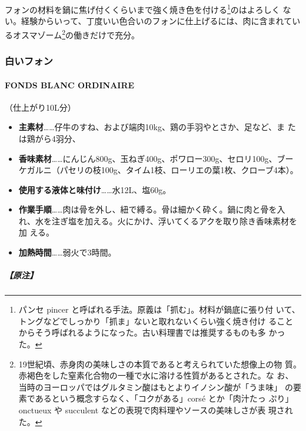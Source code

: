 \begin{recette}
フォンの材料を鍋に焦げ付くくらいまで強く焼き色を付ける\footnote{パンセ
  pincer と呼ばれる手法。原義は「抓む」。材料が鍋底に張り付
  いて、トングなどでしっかり「抓ま」ないと取れないくらい強く焼き付け
  ることからそう呼ばれるようになった。古い料理書では推奨するものも多
  かった。}のはよろしく
ない。経験からいって、丁度いい色合いのフォンに仕上げるには、肉に含まれてい
るオスマゾーム\footnote{19世紀頃、赤身肉の美味しさの本質であると考えられていた想像上の物
  質。赤褐色をした窒素化合物の一種で水に溶ける性質があるとされた。な
  お、当時のヨーロッパではグルタミン酸はもとよりイノシン酸が「うま味」
  の要素であるという概念すらなく、「コクがある」corsé とか「肉汁たっ
  ぷり」onctueux や succulent などの表現で肉料理やソースの美味しさが表
  現された。}の働きだけで充分。

\maeaki

\hypertarget{ux767dux3044ux30d5ux30a9ux30f3}{%
\subsubsection{白いフォン}\label{ux767dux3044ux30d5ux30a9ux30f3}}

\hypertarget{fonds-blanc}{%
\paragraph{FONDS BLANC ORDINAIRE}\label{fonds-blanc}}


（仕上がり10L分）

\begin{itemize}
\item
  \textbf{主素材}\ldots{}\ldots{}仔牛のすね、および端肉10kg、鶏の手羽やとさか、足など、ま
  たは鶏がら4羽分、
\item
  \textbf{香味素材}\ldots{}\ldots{}にんじん800g、玉ねぎ400g、ポワロー300g、セロリ100g、ブー
  ケガルニ（パセリの枝100g、タイム1枝、ローリエの葉1枚、クローブ4本）。
\item
  \textbf{使用する液体と味付け}\ldots{}\ldots{}水12L、塩60g。
\item
  \textbf{作業手順}\ldots{}\ldots{}肉は骨を外し、紐で縛る。骨は細かく砕く。鍋に肉と骨を入
  れ、水を注ぎ塩を加える。火にかけ、浮いてくるアクを取り除き香味素材を加
  える。
\item
  \textbf{加熱時間}\ldots{}\ldots{}弱火で3時間。
\end{itemize}

\hypertarget{ux539fux6ce8-1}{%
\subparagraph{【原注】}\label{ux539fux6ce8-1}}


\end{recette}
